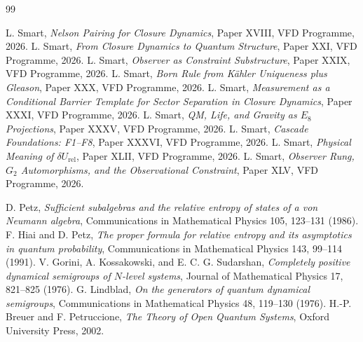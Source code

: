 \documentclass[12pt]{article}
\theoremstyle{definition}
\theoremstyle{remark}
\begin{document}

\begin{thebibliography}{99}

 L. Smart, \emph{Nelson Pairing for Closure Dynamics}, Paper XVIII, VFD Programme, 2026.
 L. Smart, \emph{From Closure Dynamics to Quantum Structure}, Paper XXI, VFD Programme, 2026.
 L. Smart, \emph{Observer as Constraint Substructure}, Paper XXIX, VFD Programme, 2026.
 L. Smart, \emph{Born Rule from K\"ahler Uniqueness plus Gleason}, Paper XXX, VFD Programme, 2026.
 L. Smart, \emph{Measurement as a Conditional Barrier Template for Sector Separation in Closure Dynamics}, Paper XXXI, VFD Programme, 2026.
 L. Smart, \emph{QM, Life, and Gravity as $E_8$ Projections}, Paper XXXV, VFD Programme, 2026.
 L. Smart, \emph{Cascade Foundations: F1--F8}, Paper XXXVI, VFD Programme, 2026.
 L. Smart, \emph{Physical Meaning of $\delta U_{\mathrm{rel}}$}, Paper XLII, VFD Programme, 2026.
 L. Smart, \emph{Observer Rung, $G_2$ Automorphisms, and the Observational Constraint}, Paper XLV, VFD Programme, 2026.

 D. Petz, \emph{Sufficient subalgebras and the relative entropy of states of a von Neumann algebra}, Communications in Mathematical Physics 105, 123--131 (1986).
 F. Hiai and D. Petz, \emph{The proper formula for relative entropy and its asymptotics in quantum probability}, Communications in Mathematical Physics 143, 99--114 (1991).
 V. Gorini, A. Kossakowski, and E. C. G. Sudarshan, \emph{Completely positive dynamical semigroups of $N$-level systems}, Journal of Mathematical Physics 17, 821--825 (1976).
 G. Lindblad, \emph{On the generators of quantum dynamical semigroups}, Communications in Mathematical Physics 48, 119--130 (1976).
 H.-P. Breuer and F. Petruccione, \emph{The Theory of Open Quantum Systems}, Oxford University Press, 2002.

\end{thebibliography}
\end{document}
